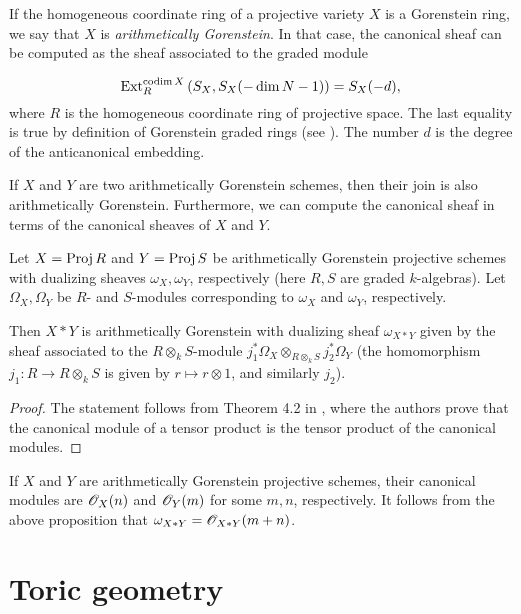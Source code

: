 If the homogeneous coordinate ring of a projective variety $X$ is a Gorenstein ring, we say that $X$ is \emph{arithmetically Gorenstein}. In that case, the canonical sheaf can be computed as the sheaf associated to the graded module

$$\operatorname{Ext}_R^{\operatorname{codim} X}\left(S_X,S_X(-\dim N-1)\right)=S_X(-d),$$
where $R$ is the homogeneous coordinate ring of projective space. The last equality is true by definition of Gorenstein graded rings (see \cite[page 550]{eisenbud_commalg}). The number $d$ is the degree of the anticanonical embedding. 

If $X$ and $Y$ are two arithmetically Gorenstein schemes, then their join is also arithmetically Gorenstein. Furthermore, we can compute the canonical sheaf in terms of the canonical sheaves of $X$ and $Y$.

\begin{proposition}
Let $X=\operatorname{Proj} R$ and $Y=\operatorname{Proj} S$ be arithmetically Gorenstein projective schemes with dualizing sheaves $\omega_X, \omega_Y$, respectively (here $R, S$ are graded $k$-algebras). Let $\Omega_X, \Omega_Y$ be $R$- and $S$-modules corresponding to $\omega_X$ and $\omega_Y$, respectively.

Then $X \ast Y$ is arithmetically Gorenstein with dualizing sheaf $\omega_{X \ast Y}$ given by the sheaf associated to the $R \otimes_k S$-module $j_1^\ast \Omega_X \otimes_{R \otimes_k S} j_2^\ast \Omega_Y$ (the homomorphism $j_1:R \to R \otimes_k S$ is given by $r \mapsto r \otimes 1$, and similarly $j_2$).
\end{proposition}

\begin{proof}
The statement follows from Theorem 4.2 in \cite{herzog_canonical}, where the authors prove that the canonical module of a tensor product is the tensor product of the canonical modules.
\end{proof}

\begin{remark}
\label{remark:canonical}
If $X$ and $Y$ are arithmetically Gorenstein projective schemes, their canonical modules are $\mathscr{O}_X(n)$ and $\mathscr{O}_Y(m)$ for some $m,n$, respectively. It follows from the above proposition that $\omega_{X \ast Y} = \mathscr{O}_{X \ast Y}(m+n)$.
\end{remark}

\section{Toric geometry}
\label{sec:toric_geometry}

